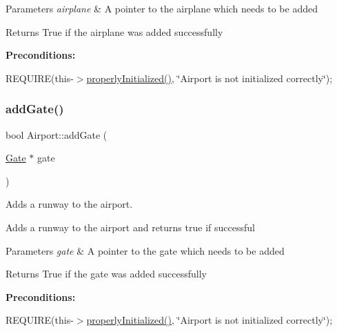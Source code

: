 \begin{DoxyParams}{Parameters}
{\em airplane} & A pointer to the airplane which needs to be added \\
\hline
\end{DoxyParams}
\begin{DoxyReturn}{Returns}
True if the airplane was added successfully
\end{DoxyReturn}
{\bfseries Preconditions\+:}
\begin{DoxyItemize}
\item R\+E\+Q\+U\+I\+RE(this-\/$>$\mbox{\hyperlink{class_airport_aa13e68ac58e8875837fbe888325cfff6}{properly\+Initialized()}}, \char`\"{}\+Airport is not initialized correctly\char`\"{}); 
\end{DoxyItemize}\mbox{\label{class_airport_a261e0c60f7e788de20ea902cb09b4569}} 
\subsubsection{\texorpdfstring{add\+Gate()}{addGate()}}
{\footnotesize\ttfamily bool Airport\+::add\+Gate (\begin{DoxyParamCaption}\item[{\mbox{\hyperlink{class_gate}{Gate}} $\ast$}]{gate }\end{DoxyParamCaption})}



Adds a runway to the airport. 

Adds a runway to the airport and returns true if successful


\begin{DoxyParams}{Parameters}
{\em gate} & A pointer to the gate which needs to be added \\
\hline
\end{DoxyParams}
\begin{DoxyReturn}{Returns}
True if the gate was added successfully
\end{DoxyReturn}
{\bfseries Preconditions\+:}
\begin{DoxyItemize}
\item R\+E\+Q\+U\+I\+RE(this-\/$>$\mbox{\hyperlink{class_airport_aa13e68ac58e8875837fbe888325cfff6}{properly\+Initialized()}}, \char`\"{}\+Airport is not initialized correctly\char`\"{}); 
\end{DoxyItemize}\mbox{\label{class_airport_a8e8c8a80b3726c1dda7408e90469b9e7}} 
